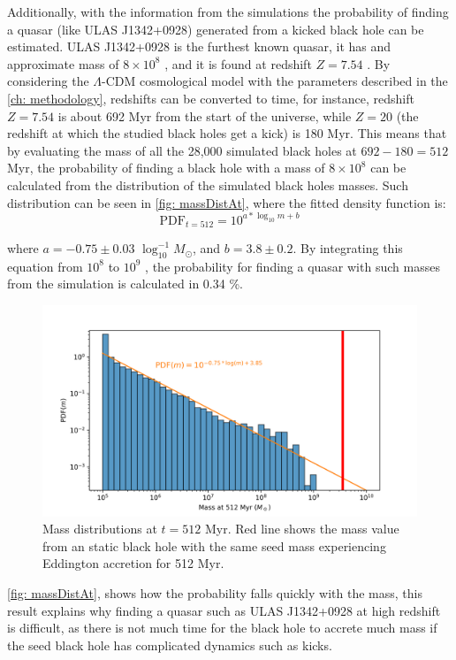 	Additionally, with the information from the simulations the probability of finding a quasar (like ULAS J1342+0928) generated from a kicked black hole can be estimated. ULAS J1342+0928 is the furthest known quasar, it has and approximate mass of $8\times10^8$ \sm, and it is found at redshift $Z = 7.54$ \cite{banados2018800, paris2018sloan}. By considering the $\Lambda$-CDM cosmological model with the parameters described in the \autoref{ch: methodology}, redshifts can be converted to time, for instance, redshift $Z = 7.54$ is about 692 Myr from the start of the universe, while $Z = 20$ (the redshift at which the studied black holes get a kick) is 180 Myr. This means that by evaluating the mass of all the 28,000 simulated black holes at $692 - 180 = 512$ Myr, the probability of finding a black hole with a mass of $8\times10^8$ \sm can be calculated from the distribution of the simulated black holes masses. Such distribution can be seen in \autoref{fig: massDistAt}, where the fitted density function is:
	\begin{equation}
		\text{PDF}_{t = 512} = 10 ^ {a * \log_{10}m + b}
	\end{equation}
	
	where $a = -0.75 \pm 0.03$ $\log_{10}^{-1}M_\odot$, and $b = 3.8 \pm 0.2$. By integrating this equation from $10^8$ to $10^9$ \sm, the probability for finding a quasar with such masses from the simulation is calculated in 0.34 \%.
	\begin{figure}[h]
		\centering
		\includegraphics[width=0.8\linewidth]{"../Files/Week 14/masses_at"}
		\caption{Mass distributions at $t = 512$ Myr. Red line shows the mass value from an static black hole with the same seed mass experiencing Eddington accretion for 512 Myr.}
		\label{fig: massDistAt}
	\end{figure}

	\autoref{fig: massDistAt}, shows how the probability falls quickly with the mass, this result explains why finding a quasar such as ULAS J1342+0928 at high redshift is difficult, as there is not much time for the black hole to accrete much mass if the seed black hole has complicated dynamics such as kicks.
	
